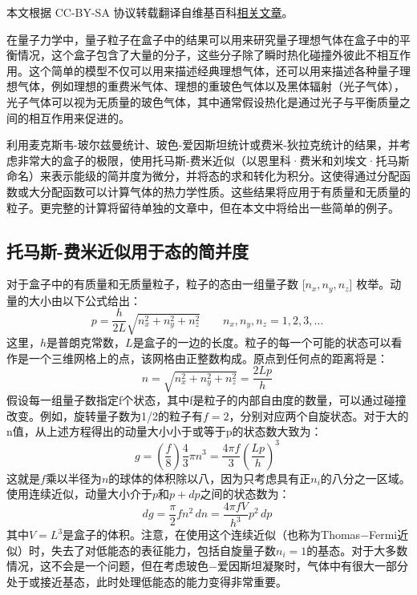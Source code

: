 
本文根据 CC-BY-SA 协议转载翻译自维基百科\href{https://en.wikipedia.org/wiki/Gas_in_a_box}{相关文章}。

在量子力学中，量子粒子在盒子中的结果可以用来研究量子理想气体在盒子中的平衡情况，这个盒子包含了大量的分子，这些分子除了瞬时热化碰撞外彼此不相互作用。这个简单的模型不仅可以用来描述经典理想气体，还可以用来描述各种量子理想气体，例如理想的重费米气体、理想的重玻色气体以及黑体辐射（光子气体），光子气体可以视为无质量的玻色气体，其中通常假设热化是通过光子与平衡质量之间的相互作用来促进的。

利用麦克斯韦-玻尔兹曼统计、玻色-爱因斯坦统计或费米-狄拉克统计的结果，并考虑非常大的盒子的极限，使用托马斯-费米近似（以恩里科·费米和刘埃文·托马斯命名）来表示能级的简并度为微分，并将态的求和转化为积分。这使得通过分配函数或大分配函数可以计算气体的热力学性质。这些结果将应用于有质量和无质量的粒子。更完整的计算将留待单独的文章中，但在本文中将给出一些简单的例子。
\subsection{托马斯-费米近似用于态的简并度}  
对于盒子中的有质量和无质量粒子，粒子的态由一组量子数 [\(n_x, n_y, n_z\)] 枚举。动量的大小由以下公式给出：
\[
p = \frac{h}{2L} \sqrt{n_x^2 + n_y^2 + n_z^2} \quad \quad n_x, n_y, n_z = 1, 2, 3, \ldots~
\]
这里，\(h\)是普朗克常数，\(L\)是盒子的一边的长度。粒子的每一个可能的状态可以看作是一个三维网格上的点，该网格由正整数构成。原点到任何点的距离将是：
\[
n = \sqrt{n_x^2 + n_y^2 + n_z^2} = \frac{2Lp}{h}~
\]
假设每一组量子数指定f个状态，其中f是粒子的内部自由度的数量，可以通过碰撞改变。例如，旋转量子数为1/2的粒子有\(f = 2\)，分别对应两个自旋状态。对于大的n值，从上述方程得出的动量大小小于或等于p的状态数大致为：
\[
g = \left( \frac{f}{8} \right) \frac{4}{3} \pi n^3 = \frac{4 \pi f}{3} \left( \frac{Lp}{h} \right)^3~
\]
这就是\(f\)乘以半径为\(n\)的球体的体积除以八，因为只考虑具有正\(n_i\)的八分之一区域。使用连续近似，动量大小介于\(p\)和\(p+dp\)之间的状态数为：
\[
dg = \frac{\pi}{2} f n^2 \, dn = \frac{4 \pi f V}{h^3} p^2 \, dp~
\]
其中\(V=L^3\)是盒子的体积。注意，在使用这个连续近似（也称为Thomas−Fermi近似）时，失去了对低能态的表征能力，包括自旋量子数\(n_i=1\)的基态。对于大多数情况，这不会是一个问题，但在考虑玻色−爱因斯坦凝聚时，气体中有很大一部分处于或接近基态，此时处理低能态的能力变得非常重要。
